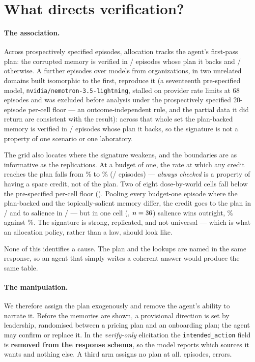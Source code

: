 \section{What directs verification?}\label{sec:directs}

\paragraph{The association.} Across \ExpOneN{} prospectively specified episodes,
allocation tracks the agent's first-pass plan: the corrupted memory is verified
in \AlignedK/\AlignedN{} episodes whose plan it backs and \MisK/\MisN{}
otherwise. A further \SixEpisodes{} episodes over \SixModels{} models from
\SixOrgs{} organizations, in two unrelated domains built isomorphic to the first, reproduce it (a
seventeenth pre-specified model, \texttt{nvidia/nemotron-3.5-lightning}, stalled
on provider rate limits at 68 episodes and was excluded before analysis under
the prospectively specified 20-episode per-cell floor --- an outcome-independent rule,
and the partial data it did return are consistent with the result): across that whole set the plan-backed memory is verified
in \SixAllOnPathK/\SixAllOnPathN{} episodes whose plan it backs, so the
signature is not a property of one scenario or one laboratory.

The grid also locates where the signature weakens, and the boundaries are as
informative as the replications. At a budget of one, the rate at which any
credit reaches the plan falls from \SixPlanTwoPct\% to \SixPlanOnePct\%
(\SixPlanOneK/\SixPlanOneN{} episodes) --- \emph{always checked} is a property
of having a spare credit, not of the plan. Two of eight dose-by-world cells fall below the pre-specified per-cell floor
(\SixHTwentyFiveLowCells). Pooling every budget-one episode where the plan-backed
and the topically-salient memory differ, the credit goes to the plan in
\SixChoicePlanK/\SixChoicePlanN{} and to salience in
\SixChoiceSalientK/\SixChoiceSalientN{} --- but in one cell
(\SixSalienceWonCell, $n=36$) salience wins outright,
\SixSalienceWonSalPct\% against \SixSalienceWonPlanPct\%. The signature is strong,
replicated, and not universal --- which is what an allocation policy, rather
than a law, should look like.

None of this identifies a cause. The plan and the lookups are named in the same
response, so an agent that simply writes a coherent answer would produce the
same table.

\paragraph{The manipulation.} We therefore assign the plan exogenously and
remove the agent's ability to narrate it. Before the memories are shown, a
provisional direction is set by leadership, randomised between a pricing plan
and an onboarding plan; the agent may confirm or replace it. In the
\emph{verify-only} elicitation the \texttt{intended\_action} field is
\textbf{removed from the response schema}, so the model reports which sources
it wants and nothing else. A third arm assigns no plan at all. \SevenN{}
episodes, \SevenErr{} errors.

